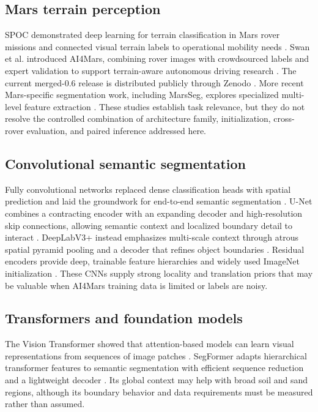 \documentclass[11pt]{article}
\begin{document}
\subsection{Mars terrain perception}

SPOC demonstrated deep learning for terrain classification in Mars rover missions and connected
visual terrain labels to operational mobility needs \cite{rothrock2016spoc}. Swan et al. introduced
AI4Mars, combining rover images with crowdsourced labels and expert validation to support
terrain-aware autonomous driving research \cite{swan2021ai4mars}. The current merged-0.6 release is
distributed publicly through Zenodo \cite{ai4marszenodo}. More recent Mars-specific segmentation
work, including MarsSeg, explores specialized multi-level feature extraction
\cite{li2024marsseg}. These studies establish task relevance, but they do not resolve the controlled
combination of architecture family, initialization, cross-rover evaluation, and paired inference
addressed here.

\subsection{Convolutional semantic segmentation}

Fully convolutional networks replaced dense classification heads with spatial prediction and laid
the groundwork for end-to-end semantic segmentation \cite{long2015fcn}. U-Net combines a contracting
encoder with an expanding decoder and high-resolution skip connections, allowing semantic context
and localized boundary detail to interact \cite{ronneberger2015unet}. DeepLabV3+ instead emphasizes
multi-scale context through atrous spatial pyramid pooling and a decoder that refines object
boundaries \cite{chen2018deeplab}. Residual encoders provide deep, trainable feature hierarchies and
widely used ImageNet initialization \cite{he2016resnet,deng2009imagenet}. These CNNs supply strong
locality and translation priors that may be valuable when AI4Mars training data is limited or
labels are noisy.

\subsection{Transformers and foundation models}

The Vision Transformer showed that attention-based models can learn visual representations from
sequences of image patches \cite{dosovitskiy2021vit}. SegFormer adapts hierarchical transformer
features to semantic segmentation with efficient sequence reduction and a lightweight decoder
\cite{xie2021segformer}. Its global context may help with broad soil and sand regions, although its
boundary behavior and data requirements must be measured rather than assumed.
\end{document}
